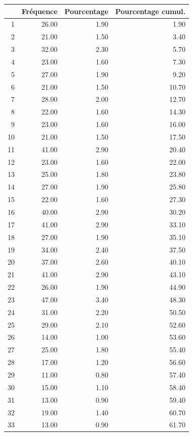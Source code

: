 \documentclass[12pt,english,french,twoside]{book}\usepackage[]{graphicx}\usepackage[]{color}
\begin{document}
\begin{table}[ht]
\centering
\begin{tabular}{rrrr}
  \hline
 & Fréquence & Pourcentage & Pourcentage cumul. \\ 
  \hline
1 & 26.00 & 1.90 & 1.90 \\ 
  2 & 21.00 & 1.50 & 3.40 \\ 
  3 & 32.00 & 2.30 & 5.70 \\ 
  4 & 23.00 & 1.60 & 7.30 \\ 
  5 & 27.00 & 1.90 & 9.20 \\ 
  6 & 21.00 & 1.50 & 10.70 \\ 
  7 & 28.00 & 2.00 & 12.70 \\ 
  8 & 22.00 & 1.60 & 14.30 \\ 
  9 & 23.00 & 1.60 & 16.00 \\ 
  10 & 21.00 & 1.50 & 17.50 \\ 
  11 & 41.00 & 2.90 & 20.40 \\ 
  12 & 23.00 & 1.60 & 22.00 \\ 
  13 & 25.00 & 1.80 & 23.80 \\ 
  14 & 27.00 & 1.90 & 25.80 \\ 
  15 & 22.00 & 1.60 & 27.30 \\ 
  16 & 40.00 & 2.90 & 30.20 \\ 
  17 & 41.00 & 2.90 & 33.10 \\ 
  18 & 27.00 & 1.90 & 35.10 \\ 
  19 & 34.00 & 2.40 & 37.50 \\ 
  20 & 37.00 & 2.60 & 40.10 \\ 
  21 & 41.00 & 2.90 & 43.10 \\ 
  22 & 26.00 & 1.90 & 44.90 \\ 
  23 & 47.00 & 3.40 & 48.30 \\ 
  24 & 31.00 & 2.20 & 50.50 \\ 
  25 & 29.00 & 2.10 & 52.60 \\ 
  26 & 14.00 & 1.00 & 53.60 \\ 
  27 & 25.00 & 1.80 & 55.40 \\ 
  28 & 17.00 & 1.20 & 56.60 \\ 
  29 & 11.00 & 0.80 & 57.40 \\ 
  30 & 15.00 & 1.10 & 58.40 \\ 
  31 & 13.00 & 0.90 & 59.40 \\ 
  32 & 19.00 & 1.40 & 60.70 \\ 
  33 & 13.00 & 0.90 & 61.70 \\ 

\end{tabular}
\end{table}
\end{document}

